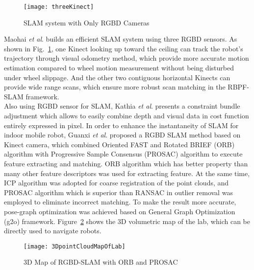 %
\begin{figure}[t]
\centering
\texttt{[image: threeKinect]}
\caption{\gls{SLAM} system with Only \gls{RGBD} Cameras \cite{RGBDSLAMsystem_2013}}
\label{threeKinect}
\end{figure}%
%
Maohai \textit{et al}. \cite{RGBDSLAMsystem_2013} builds an efficient \gls{SLAM} system using three \gls{RGBD} sensors. As shown in Fig.~\ref{threeKinect}, one Kinect looking up toward the ceiling can track the robot's trajectory through visual odometry method, which provide more accurate motion estimation compared to wheel motion measurement without being disturbed under wheel slippage. And the other two contiguous horizontal Kinects can provide wide range scans, which ensure more robust scan matching in the RBPF-\gls{SLAM} framework. %
\\\indent
%
Also using \gls{RGBD} sensor for \gls{SLAM}, Kathia \textit{et al}. \cite{bundleSLAMRGBD_2015} presents a constraint bundle adjustment which allows to easily combine depth and visual data in cost function entirely expressed in pixel. In order to enhance the instantaneity of \gls{SLAM} for indoor mobile robot, Guanxi \textit{et al}. \cite{indorRGBDSLAM_2015} proposed a \gls{RGBD} \gls{SLAM} method based on Kinect camera, which combined Oriented FAST and Rotated BRIEF (ORB) algorithm with Progressive Sample Consensus (PROSAC) algorithm to execute feature extracting and matching. %
%
%
ORB algorithm which has better property than many other feature descriptors was used for extracting feature. At the same time, ICP algorithm was adopted for coarse registration of the point clouds, and PROSAC algorithm which is superior than RANSAC in outlier removal was employed to eliminate incorrect matching. To make the result more accurate, pose-graph optimization was achieved based on General Graph Optimization (g2o) framework. Figure~\ref{3DpointCloudMapOfLab} shows the \gls{3D} volumetric map of the lab, which can be directly used to navigate robots.
\\\indent%
\begin{figure}[t]
\centering
\texttt{[image: 3DpointCloudMapOfLab]}
\caption{\gls{3D} Map of \gls{RGBD}-\gls{SLAM} with ORB and PROSAC \cite{indorRGBDSLAM_2015}}
\label{3DpointCloudMapOfLab}
\end{figure}%
